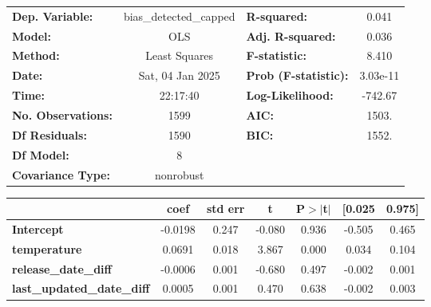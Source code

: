 \begin{center}
\begin{tabular}{lclc}
\toprule
\textbf{Dep. Variable:}                     & bias\_detected\_capped & \textbf{  R-squared:         } &     0.041   \\
\textbf{Model:}                             &          OLS           & \textbf{  Adj. R-squared:    } &     0.036   \\
\textbf{Method:}                            &     Least Squares      & \textbf{  F-statistic:       } &     8.410   \\
\textbf{Date:}                              &    Sat, 04 Jan 2025    & \textbf{  Prob (F-statistic):} &  3.03e-11   \\
\textbf{Time:}                              &        22:17:40        & \textbf{  Log-Likelihood:    } &   -742.67   \\
\textbf{No. Observations:}                  &           1599         & \textbf{  AIC:               } &     1503.   \\
\textbf{Df Residuals:}                      &           1590         & \textbf{  BIC:               } &     1552.   \\
\textbf{Df Model:}                          &              8         & \textbf{                     } &             \\
\textbf{Covariance Type:}                   &       nonrobust        & \textbf{                     } &             \\
\bottomrule
\end{tabular}
\begin{tabular}{lcccccc}
                                            & \textbf{coef} & \textbf{std err} & \textbf{t} & \textbf{P$> |$t$|$} & \textbf{[0.025} & \textbf{0.975]}  \\
\midrule
\textbf{Intercept}                          &      -0.0198  &        0.247     &    -0.080  &         0.936        &       -0.505    &        0.465     \\
\textbf{temperature}                        &       0.0691  &        0.018     &     3.867  &         0.000        &        0.034    &        0.104     \\
\textbf{release\_date\_diff}                &      -0.0006  &        0.001     &    -0.680  &         0.497        &       -0.002    &        0.001     \\
\textbf{last\_updated\_date\_diff}          &       0.0005  &        0.001     &     0.470  &         0.638        &       -0.002    &        0.003     \\

\end{tabular}
\end{center}
